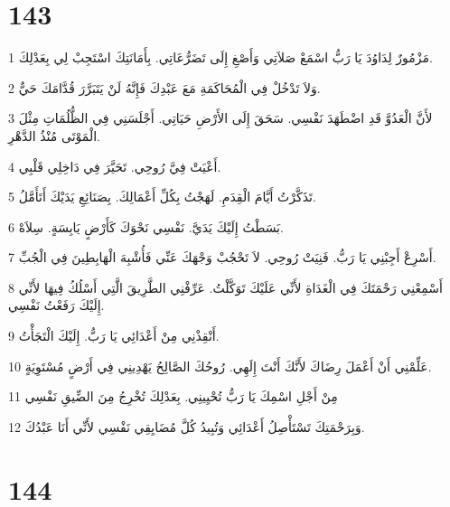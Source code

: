 \chapter{143}

\par 1 مَزْمُورٌ لِدَاوُدَ يَا رَبُّ اسْمَعْ صَلاَتِي وَأَصْغِ إِلَى تَضَرُّعَاتِي. بِأَمَانَتِكَ اسْتَجِبْ لِي بِعَدْلِكَ.
\par 2 وَلاَ تَدْخُلْ فِي الْمُحَاكَمَةِ مَعَ عَبْدِكَ فَإِنَّهُ لَنْ يَتَبَرَّرَ قُدَّامَكَ حَيٌّ.
\par 3 لأَنَّ الْعَدُوَّ قَدِ اضْطَهَدَ نَفْسِي. سَحَقَ إِلَى الأَرْضِ حَيَاتِي. أَجْلَسَنِي فِي الظُّلُمَاتِ مِثْلَ الْمَوْتَى مُنْذُ الدَّهْرِ.
\par 4 أَعْيَتْ فِيَّ رُوحِي. تَحَيَّرَ فِي دَاخِلِي قَلْبِي.
\par 5 تَذَكَّرْتُ أَيَّامَ الْقِدَمِ. لَهَجْتُ بِكُلِّ أَعْمَالِكَ. بِصَنَائِعِ يَدَيْكَ أَتَأَمَّلُ.
\par 6 بَسَطْتُ إِلَيْكَ يَدَيَّ. نَفْسِي نَحْوَكَ كَأَرْضٍ يَابِسَةٍ. سِلاَهْ.
\par 7 أَسْرِعْ أَجِبْنِي يَا رَبُّ. فَنِيَتْ رُوحِي. لاَ تَحْجُبْ وَجْهَكَ عَنِّي فَأُشْبِهَ الْهَابِطِينَ فِي الْجُبِّ.
\par 8 أَسْمِعْنِي رَحْمَتَكَ فِي الْغَدَاةِ لأَنِّي عَلَيْكَ تَوَكَّلْتُ. عَرِّفْنِي الطَّرِيقَ الَّتِي أَسْلُكُ فِيهَا لأَنِّي إِلَيْكَ رَفَعْتُ نَفْسِي.
\par 9 أَنْقِذْنِي مِنْ أَعْدَائِي يَا رَبُّ. إِلَيْكَ الْتَجَأْتُ.
\par 10 عَلِّمْنِي أَنْ أَعْمَلَ رِضَاكَ لأَنَّكَ أَنْتَ إِلَهِي. رُوحُكَ الصَّالِحُ يَهْدِينِي فِي أَرْضٍ مُسْتَوِيَةٍ.
\par 11 مِنْ أَجْلِ اسْمِكَ يَا رَبُّ تُحْيِينِي. بِعَدْلِكَ تُخْرِجُ مِنَ الضِّيقِ نَفْسِي
\par 12 وَبِرَحْمَتِكَ تَسْتَأْصِلُ أَعْدَائِي وَتُبِيدُ كُلَّ مُضَايِقِي نَفْسِي لأَنِّي أَنَا عَبْدُكَ.

\chapter{144}

